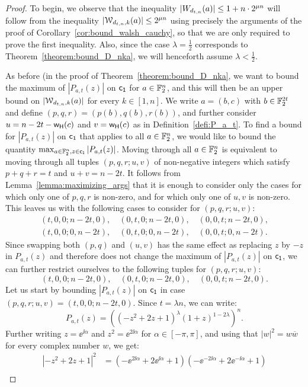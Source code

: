 \documentclass[11pt]{llncs}
\begin{document}
\begin{proof}
    To begin, we observe that the inequality $|W_{d_{t,n}}(a)|\leq 1+n\cdot 2^{\mu n}$ will follow from the inequality $|\mathcal{W}_{d_{t,n},k}(a)|\leq 2^{\mu n}$ using precisely the arguments of the proof of Corollary~\ref{cor:bound_walsh_cauchy}, so that we are only required to prove the first inequality. Also, since the case $\lambda=\frac 12$ corresponds to Theorem~\ref{theorem:bound_D_nka}, we will henceforth assume $\lambda<\frac 12$.
    
    As before (in the proof of Theorem~\ref{theorem:bound_D_nka}, we want to bound the maximum of $|P_{a,t}(z)|$ on $\mathsf{c_1}$ for $a\in\mathbb{F}_2^n$, and this will then be an upper bound on $|\mathcal{W}_{d_{t,n},k}(a)|$ for every $k\in[1,n]$. 
    We write $a=(b,c)$ with $b\in\mathbb{F}_2^{2t}$ and define $(p,q,r)=(p(b),q(b),r(b))$, and further consider $u=n-2t-\mathsf{w_H}(c)$ and $v=\mathsf{w_H}(c)$ as in Definition~\ref{defi:P_a_t}.    
   To find a bound for $|P_{a,t}(z)|$ on $\mathsf{c_1}$ that applies to all $a\in\mathbb{F}_2^n$, we would like to bound the quantity $\max_{a\in\mathbb{F}_2^n,z\in\mathsf{c_1}}|P_{a,t}(z)|$. Moving through all $a\in\mathbb{F}_2^n$ is equivalent to moving through all tuples $(p,q,r;u,v)$ of non-negative integers which satisfy $p+q+r=t$ and $u+v=n-2t$. It follows from Lemma~\ref{lemma:maximizing_args} that it is enough to consider only the cases for which only one of $p,q,r$ is non-zero, and for which only one of $u,v$ is non-zero. 
   This leaves us with the following cases to consider for $(p,q,r;u,v)$:
    \begin{gather*}
        (t,0,0;n-2t,0),\quad(0,t,0;n-2t,0),\quad(0,0,t;n-2t,0),\\
         (t,0,0;0,n-2t),\quad(0,t,0;0,n-2t),\quad(0,0,t;0,n-2t).
    \end{gather*}
    Since swapping both $(p,q)$ and $(u,v)$ has the same effect as replacing $z$ by $-z$ in $P_{a,t}(z)$ and therefore does not change the maximum of $|P_{a,t}(z)|$ on $\mathsf{c_1}$, we can further restrict ourselves to the following tuples for $(p,q,r;u,v)$:
    \[
        (t,0,0;n-2t,0),\quad(0,t,0;n-2t,0),\quad(0,0,t;n-2t,0).
    \]
    Let us start by bounding $|P_{a,t}(z)|$ on $\mathsf{c_1}$ in case $(p,q,r;u,v)=(t,0,0;n-2t,0)$. Since $t=\lambda n$, we can write:
    \[
        P_{a,t}(z)=\left((-z^2+2z+1)^{\lambda}(1+z)^{1-2\lambda}\right)^n.
    \]
    Further writing $z=\ee^{\ii\alpha}$ and $z^2=\ee^{2\ii\alpha}$ for $\alpha\in[-\pi,\pi]$, and using that $|w|^2=w\overline w$ for every complex number $w$, we get:
    \begin{align*}
        |-z^2+2z+1|^2&=\left(-\ee^{2\ii\alpha}+2\ee^{\ii\alpha}+1\right)\left(-\ee^{-2\ii\alpha}+2\ee^{-\ii\alpha}+1\right)\\

\end{align*}
\end{proof}
\end{document}
